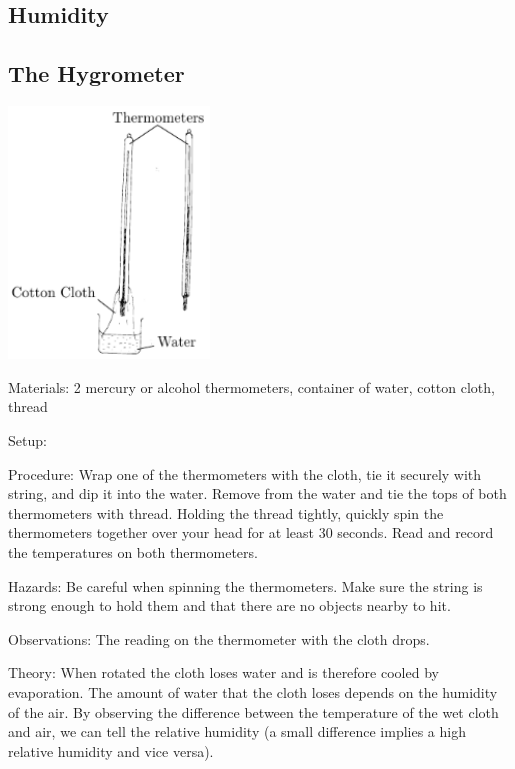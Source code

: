 \begin{multicols}{2}

\section*{Humidity}


\subsection{The Hygrometer}

\begin{center}
\includegraphics[width=0.4\textwidth]{./img/hygrometer.png}
\end{center}

\begin{description*}
\item[Materials:]{2 mercury or alcohol thermometers, container of water, cotton cloth, thread}
\item[Setup:]{}
\item[Procedure:]{Wrap one of the thermometers with the cloth, tie it securely with string, and dip it into the water. Remove from the water and tie the tops of both thermometers with thread. Holding the thread tightly, quickly spin the thermometers together over your head for at least 30 seconds. Read and record the temperatures on both thermometers.}
\item[Hazards:]{Be careful when spinning the thermometers. Make sure the string is strong enough to hold them and that there are no objects nearby to hit.}
\item[Observations:]{The reading on the thermometer with the cloth drops.}
\item[Theory:]{When rotated the cloth loses water and is therefore cooled by evaporation. The amount of water that the cloth loses depends on the humidity of the air. By observing the difference between the temperature of the wet cloth and air, we can tell the relative humidity (a small difference implies a high relative humidity and vice versa).}
\end{description*}



\end{multicols}

\pagebreak